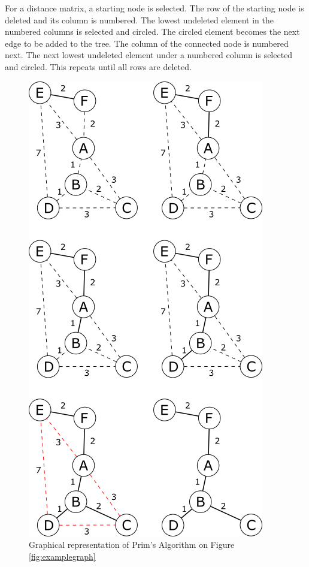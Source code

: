 \documentclass[twocolumn]{article}
\begin{document}
For a distance matrix, a starting node is selected. The row of the starting node is deleted and its column is numbered. The lowest undeleted element in the numbered columns is selected and circled. The circled element becomes the next edge to be added to the tree. The column of the connected node is numbered next. The next lowest undeleted element under a numbered column is selected and circled. This repeats until all rows are deleted.


\begin{figure}[H]
\centering
\includegraphics[width=0.75\columnwidth]{Figures/Prim Example.png}
\caption{Graphical representation of Prim’s Algorithm on Figure \ref{fig:examplegraph}}
\end{figure}
\end{document}
